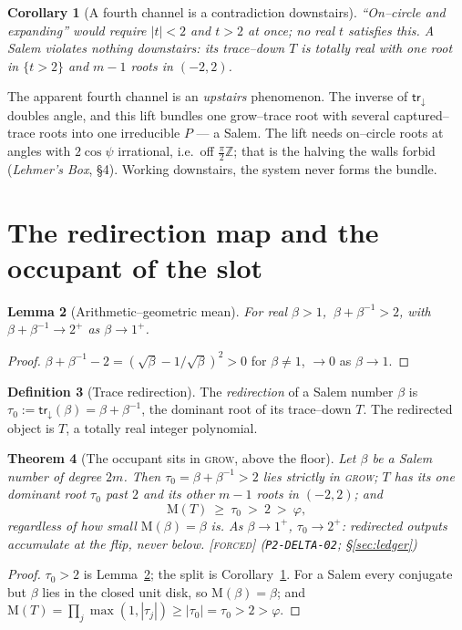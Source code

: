 \documentclass[11pt]{article}
\theoremstyle{plain}
\newtheorem{theorem}{Theorem}[section]
\newtheorem{lemma}[theorem]{Lemma}
\newtheorem{corollary}[theorem]{Corollary}
\theoremstyle{definition}
\newtheorem{definition}[theorem]{Definition}
\theoremstyle{remark}
\newcommand{\forced}{\textcolor{forcedc}{\textsc{[forced]}}}
\newcommand{\Z}{\mathbb{Z}}
\newcommand{\Mah}{\mathrm{M}}
\newcommand{\abs}[1]{\left\lvert #1 \right\rvert}
\newcommand{\trace}{\mathsf{tr}_{\!\downarrow}}
\begin{document}
\begin{corollary}[A fourth channel is a contradiction downstairs]\label{cor:nofourth}
``On--circle and expanding'' would require $\abs t<2$ \emph{and} $t>2$ at once; no real $t$ satisfies this. A Salem violates nothing downstairs: its trace--down $T$ is totally real with one root in $\{t>2\}$ and $m-1$ roots in $(-2,2)$.
\end{corollary}

The apparent fourth channel is an \emph{upstairs} phenomenon. The inverse of $\trace$ doubles angle, and this lift bundles one grow--trace root with several captured--trace roots into one irreducible $P$ --- a Salem. The lift needs on--circle roots at angles with $2\cos\psi$ irrational, i.e.\ off $\tfrac\pi2\Z$; that is the halving the walls forbid (\emph{Lehmer's Box}, \S4). Working downstairs, the system never forms the bundle.

\section{The redirection map and the occupant of the slot}\label{sec:redirect}

\begin{lemma}[Arithmetic--geometric mean]\label{lem:amgm}
For real $\beta>1$, $\ \beta+\beta^{-1}>2$, with $\beta+\beta^{-1}\to2^+$ as $\beta\to1^+$.
\end{lemma}
\begin{proof}
$\beta+\beta^{-1}-2=(\sqrt\beta-1/\sqrt\beta)^2>0$ for $\beta\neq1$, $\to0$ as $\beta\to1$.
\end{proof}

\begin{definition}[Trace redirection]\label{def:redirect}
The \emph{redirection} of a Salem number $\beta$ is $\tau_0:=\trace(\beta)=\beta+\beta^{-1}$, the dominant root of its trace--down $T$. The redirected object is $T$, a totally real integer polynomial.
\end{definition}

\begin{theorem}[The occupant sits in \textsc{grow}, above the floor]\label{thm:occupant}
Let $\beta$ be a Salem number of degree $2m$. Then $\tau_0=\beta+\beta^{-1}>2$ lies strictly in \textsc{grow}; $T$ has its one dominant root $\tau_0$ past $2$ and its other $m-1$ roots in $(-2,2)$; and
\[
\Mah(T)\ \ge\ \tau_0\ >\ 2\ >\ \varphi,
\]
\emph{regardless} of how small $\Mah(\beta)=\beta$ is. As $\beta\to1^+$, $\tau_0\to2^+$: redirected outputs accumulate at the flip, never below. \forced{} {\small(\texttt{P2-DELTA-02}; \S\ref{sec:ledger})}
\end{theorem}
\begin{proof}
$\tau_0>2$ is Lemma~\ref{lem:amgm}; the split is Corollary~\ref{cor:nofourth}. For a Salem every conjugate but $\beta$ lies in the closed unit disk, so $\Mah(\beta)=\beta$; and $\Mah(T)=\prod_j\max(1,\abs{\tau_j})\ge\abs{\tau_0}=\tau_0>2>\varphi$.
\end{proof}
\end{document}
